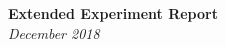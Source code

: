 \documentclass{article}
\begin{document}
\begin{titlepage}
	\begin{center}
		\Large\textbf{Extended Experiment Report}\\
		\large\textit{December 2018}
	\end{center}
\end{titlepage}

%
%
%
%
\end{document}
